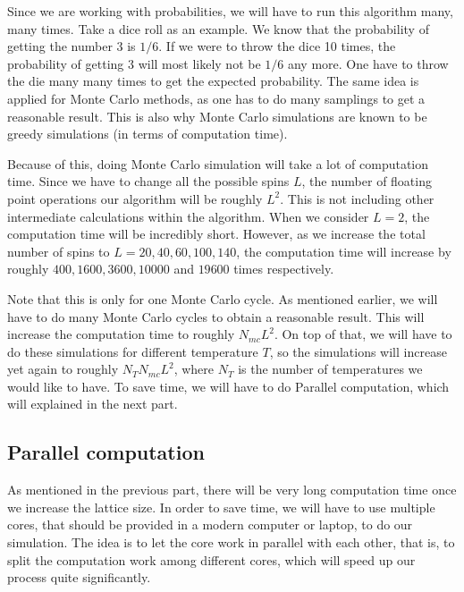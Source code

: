 \documentclass[12pt]{article}
\begin{document}
Since we are working with probabilities, we will have to run this algorithm many, many times. Take a dice roll as an example. We know that the probability of getting the number 3 is $1/6$. If we were to throw the dice 10 times, the probability of getting 3 will most likely not be $1/6$ any more. One have to throw the die many many times to get the expected probability. The same idea is applied for Monte Carlo methods, as one has to do many samplings to get a reasonable result. This is also why Monte Carlo simulations are known to be greedy simulations (in terms of computation time).

Because of this, doing Monte Carlo simulation will take a lot of computation time. Since we have to change all the possible spins $L$, the number of floating point operations our algorithm will be roughly $L^2$. This is not including other intermediate calculations within the algorithm. When we consider $L = 2$, the computation time will be incredibly short. However, as we increase the total number of spins to $L = 20, 40, 60, 100, 140$, the computation time will increase by roughly $400, 1600, 3600, 10 000$ and $19 600$ times respectively.

Note that this is only for one Monte Carlo cycle. As mentioned earlier, we will have to do many Monte Carlo cycles to obtain a reasonable result. This will increase the computation time to roughly $N_{mc} L^2$. On top of that, we  will have to do these simulations for different temperature $T$, so the simulations will increase yet again to roughly $N_T N_{mc} L^2$, where $N_T$ is the number of temperatures we would like to have. To save time, we will have to do Parallel computation, which will explained in the next part.

\subsection{Parallel computation}
As mentioned in the previous part, there will be very long computation time once we increase the lattice size. In order to save time, we will have to use multiple cores, that should be provided in a modern computer or laptop, to do our simulation. The idea is to let the core work in parallel with each other, that is, to split the computation work among different cores, which will speed up our process quite significantly.
\end{document}
